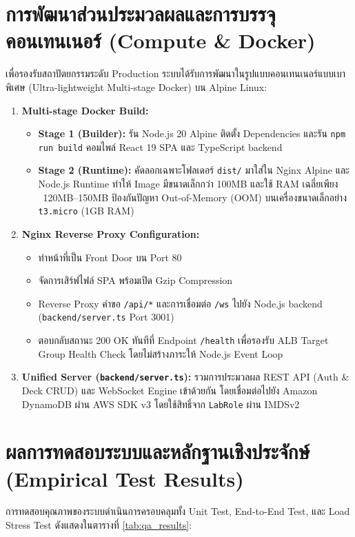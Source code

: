 \documentclass[12pt,a4paper]{report}
\begin{document}
\section{การพัฒนาส่วนประมวลผลและการบรรจุคอนเทนเนอร์ (Compute \& Docker)}
เพื่อรองรับสถาปัตยกรรมระดับ Production ระบบได้รับการพัฒนาในรูปแบบคอนเทนเนอร์แบบเบาพิเศษ (Ultra-lightweight Multi-stage Docker) บน Alpine Linux:
\begin{enumerate}
    \item \textbf{Multi-stage Docker Build:}
    \begin{itemize}
        \item \textbf{Stage 1 (Builder):} รัน Node.js 20 Alpine ติดตั้ง Dependencies และรัน \texttt{npm run build} คอมไพล์ React 19 SPA และ TypeScript backend
        \item \textbf{Stage 2 (Runtime):} คัดลอกเฉพาะโฟลเดอร์ \texttt{dist/} มาใส่ใน Nginx Alpine และ Node.js Runtime ทำให้ Image มีขนาดเล็กกว่า 100MB และใช้ RAM เฉลี่ยเพียง ~120MB--150MB ป้องกันปัญหา Out-of-Memory (OOM) บนเครื่องขนาดเล็กอย่าง \texttt{t3.micro} (1GB RAM)
    \end{itemize}
    \item \textbf{Nginx Reverse Proxy Configuration:}
    \begin{itemize}
        \item ทำหน้าที่เป็น Front Door บน Port 80
        \item จัดการเสิร์ฟไฟล์ SPA พร้อมเปิด Gzip Compression
        \item Reverse Proxy คำขอ \texttt{/api/*} และการเชื่อมต่อ \texttt{/ws} ไปยัง Node.js backend (\texttt{backend/server.ts} Port 3001)
        \item ตอบกลับสถานะ 200 OK ทันทีที่ Endpoint \texttt{/health} เพื่อรองรับ ALB Target Group Health Check โดยไม่สร้างภาระให้ Node.js Event Loop
    \end{itemize}
    \item \textbf{Unified Server (\texttt{backend/server.ts}):} รวมการประมวลผล REST API (Auth \& Deck CRUD) และ WebSocket Engine เข้าด้วยกัน โดยเชื่อมต่อไปยัง Amazon DynamoDB ผ่าน AWS SDK v3 โดยใช้สิทธิ์จาก \texttt{LabRole} ผ่าน IMDSv2
\end{enumerate}

\section{ผลการทดสอบระบบและหลักฐานเชิงประจักษ์ (Empirical Test Results)}
การทดสอบคุณภาพของระบบดำเนินการครอบคลุมทั้ง Unit Test, End-to-End Test, และ Load Stress Test ดังแสดงในตารางที่ \ref{tab:qa_results}:
\end{document}
